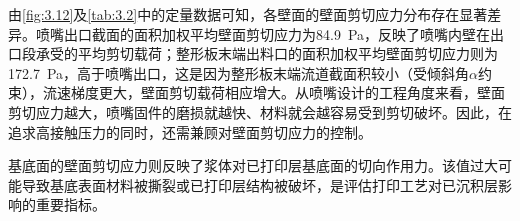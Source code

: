 由\cref{fig:3.12}及\cref{tab:3.2}中的定量数据可知，各壁面的壁面剪切应力分布存在显著差异。喷嘴出口截面的面积加权平均壁面剪切应力为84.9~Pa，反映了喷嘴内壁在出口段承受的平均剪切载荷；整形板末端出料口的面积加权平均壁面剪切应力则为172.7~Pa，高于喷嘴出口，这是因为整形板末端流道截面积较小（受倾斜角$\alpha$约束），流速梯度更大，壁面剪切载荷相应增大。从喷嘴设计的工程角度来看，壁面剪切应力越大，喷嘴固件的磨损就越快、材料就会越容易受到剪切破坏。因此，在追求高接触压力的同时，还需兼顾对壁面剪切应力的控制。

基底面的壁面剪切应力则反映了浆体对已打印层基底面的切向作用力。该值过大可能导致基底表面材料被撕裂或已打印层结构被破坏，是评估打印工艺对已沉积层影响的重要指标。
